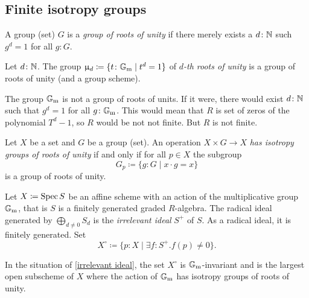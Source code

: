 \subsection{Finite isotropy groups}

\begin{definition}
  A group (set) $G$ is a \emph{group of roots of unity} if there
  merely exists a $d\colon \mathbb{N}$ such $g^d = 1$ for all $g\colon G$.
\end{definition}

\begin{example}
  Let $d\colon \mathbb{N}$.  The group
  $\upmu_d \coloneqq \{t \colon \mathbb{G}_\mathrm{m} \mid t^d = 1\}$ of \emph{$d$-th
    roots of unity} is a group of roots of unity (and a group scheme).
\end{example}

\begin{example}
  The group $\mathbb{G}_\mathrm{m}$ is not a group of roots of units.  If it were, there
  would exist $d\colon \mathbb{N}$ such that $g^d = 1$ for all $g\colon \mathbb{G}_\mathrm{m}$.
  This would mean that $R$ is set of zeros of the polynomial
  $T^d - 1$, so $R$ would be not not finite.  But $R$ is not finite.
\end{example}

\begin{definition}
  Let $X$ be a set and $G$ be a group (set).  An operation
  $X \times G \to X$ \emph{has isotropy groups of roots of unity} if
  and only if for all $p \in X$ the subgroup
  \begin{equation*}
    G_p \coloneqq \{g\colon G \mid x \cdot g = x\}
  \end{equation*}
  is a group of roots of unity.
\end{definition}

\begin{definition}\label{irrelevant ideal}
  Let $X \coloneqq \operatorname{Spec} S$ be an affine scheme with an action of the
  multiplicative group $\mathbb{G}_\mathrm{m}$, that is $S$ is a finitely generated
  graded $R$-algebra.  The radical ideal generated by
  $\bigoplus_{d \neq 0} S_d$ is the \emph{irrelevant ideal} $S^+$ of
  $S$.  As a radical ideal, it is finitely generated.  Set
  \begin{equation*}
    X^\circ \coloneqq \{p\colon X \mid \exists f\colon S^+. f(p) \neq 0\}.
  \end{equation*}
\end{definition}

\begin{proposition}
  In the situation of \cref{irrelevant ideal}, the set $X^\circ$ is
  $\mathbb{G}_\mathrm{m}$-invariant and is the largest open subscheme of $X$ where the
  action of $\mathbb{G}_\mathrm{m}$ has isotropy groups of roots of unity.
\end{proposition}

